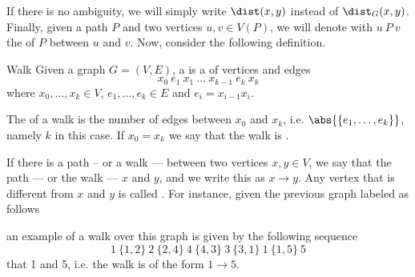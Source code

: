 \documentclass[a4paper, 12pt]{report}
\begin{document}
    If there is no ambiguity, we will simply write $\dist(x, y)$ instead of $\dist_G(x, y)$. Finally, given a path $P$ and two vertices $u, v \in V(P)$, we will denote with $u \ P \ v$ the  of $P$ between $u$ and $v$. Now, consider the following definition.

    \begin{frameddefn}{Walk}
        Given a graph $G = (V, E)$, a  is a  of vertices and edges $$x_0 \ e_1 \ x_1 \ \ldots \ x_{k - 1} \ e_k \ x_k$$ where $x_0, \ldots, x_k \in V$, $e_1, \ldots, e_k \in E$ and $e_i = x_{i - 1}x_i$.

        The  of a walk is the number of edges between $x_0$ and $x_k$, i.e. $\abs{\{e_1, \ldots , e_k \}}$, namely $k$ in this case. If $x_0 = x_k$ we say that the walk is .
    \end{frameddefn}

    If there is a path -- or a walk --- between two vertices $x, y \in V$, we say that the path --- or the walk ---  $x$ and $y$, and we write this as $x \to y$. Any vertex that is different from $x$ and $y$ is called . For instance, given the previous graph labeled as follows

    \begin{figure}[H]
        \centering
    \end{figure}

    an example of a walk over this graph is given by the following sequence $$1 \ \{1, 2\} \ 2 \ \{2, 4\} \ 4 \ \{4, 3\} \ 3 \ \{3, 1\} \ 1 \ \{1, 5\} \ 5$$ that  1 and 5, i.e. the walk is of the form $1 \to 5$.
\end{document}

